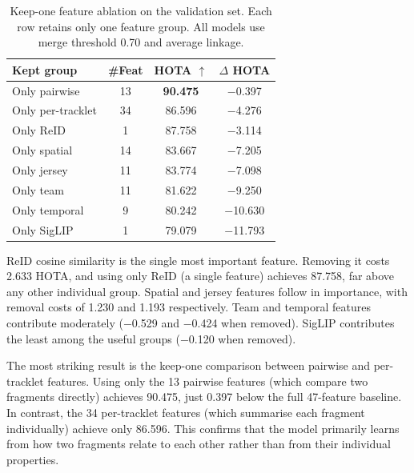 \begin{table}[H]
\centering
\begin{tabular}{lccc}
\toprule
\textbf{Kept group} & \textbf{\#Feat} & \textbf{HOTA $\uparrow$} & \textbf{$\Delta$ HOTA} \\
\midrule
Only pairwise        & 13 & \textbf{90.475} & $-$0.397 \\
Only per-tracklet    & 34 & 86.596 & $-$4.276 \\
\midrule
Only ReID            &  1 & 87.758 & $-$3.114 \\
Only spatial         & 14 & 83.667 & $-$7.205 \\
Only jersey          & 11 & 83.774 & $-$7.098 \\
Only team            & 11 & 81.622 & $-$9.250 \\
Only temporal        &  9 & 80.242 & $-$10.630 \\
Only SigLIP          &  1 & 79.079 & $-$11.793 \\
\bottomrule
\end{tabular}
\caption{Keep-one feature ablation on the validation set. Each row retains only one feature group. All models use merge threshold 0.70 and average linkage.}
\label{tab:feature_ablation_keep}
\end{table}

ReID cosine similarity is the single most important feature. Removing it costs 2.633 HOTA, and using only ReID (a single feature) achieves 87.758, far above any other individual group. Spatial and jersey features follow in importance, with removal costs of 1.230 and 1.193 respectively. Team and temporal features contribute moderately ($-$0.529 and $-$0.424 when removed). SigLIP contributes the least among the useful groups ($-$0.120 when removed).

The most striking result is the keep-one comparison between pairwise and per-tracklet features. Using only the 13 pairwise features (which compare two fragments directly) achieves 90.475, just 0.397 below the full 47-feature baseline. In contrast, the 34 per-tracklet features (which summarise each fragment individually) achieve only 86.596. This confirms that the model primarily learns from how two fragments relate to each other rather than from their individual properties.


